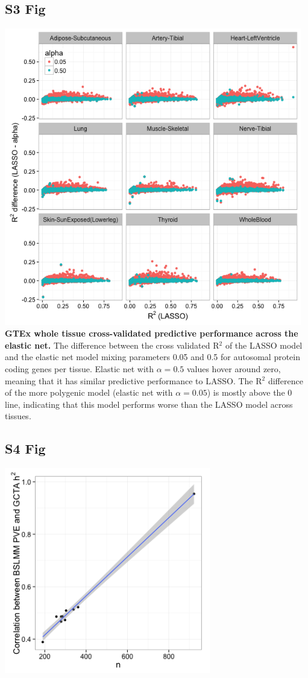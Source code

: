 \documentclass[10pt,letterpaper]{article}
\begin{document}
\begin{singlespace}
\subsection*{S3 Fig}
\includegraphics[width=13cm]{Figures/GenArch_Supp/S2Fig.png}
\label{S3_Fig}
{\bf GTEx whole tissue cross-validated predictive performance across the elastic net.} The difference between the cross validated R$^2$ of the LASSO model and the elastic net model mixing parameters 0.05 and 0.5 for autosomal protein coding genes per tissue. Elastic net with $\alpha=0.5$ values hover around zero, meaning that it has similar predictive performance to LASSO. The R$^2$ difference of the more polygenic model (elastic net with $\alpha=0.05$) is mostly above the 0 line, indicating that this model performs worse than the LASSO model across tissues.

\subsection*{S4 Fig}
\includegraphics[width=9cm]{Figures/Fig-R_gcta_bslmm_v_n.png}
\label{S4_Fig}


\end{singlespace}
\end{document}
